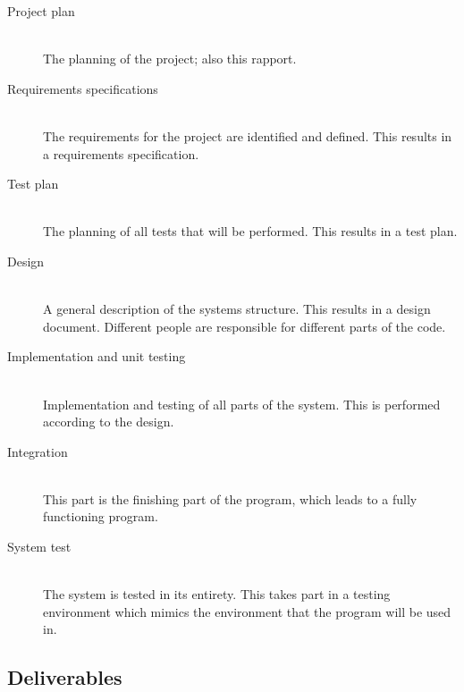 \documentclass[12pt,titlepage]{article}
\begin{document}
\begin{description}
	\item[Project plan] \hfill \\
		The planning of the project; also this rapport.
	\item[Requirements specifications] \hfill \\
		The requirements for the project are identified and defined.
		This results in a requirements specification.
	\item[Test plan] \hfill \\
		The planning of all tests that will be performed.
		This results in a test plan.
	\item[Design] \hfill \\
		A general description of the systems structure.
		This results in a design document.
		Different people are responsible for different parts of the
		code.
	\item[Implementation and unit testing] \hfill \\
		Implementation and testing of all parts of the system.
		This is performed according to the design.
	\item[Integration] \hfill \\
		This part is the finishing part of the program,
		which leads to a fully functioning program.
	\item[System test] \hfill \\
		The system is tested in its entirety. This takes part in a
		testing environment which mimics the environment that the
		program will be used in.
\end{description}

\subsection{Deliverables}

\end{document}

